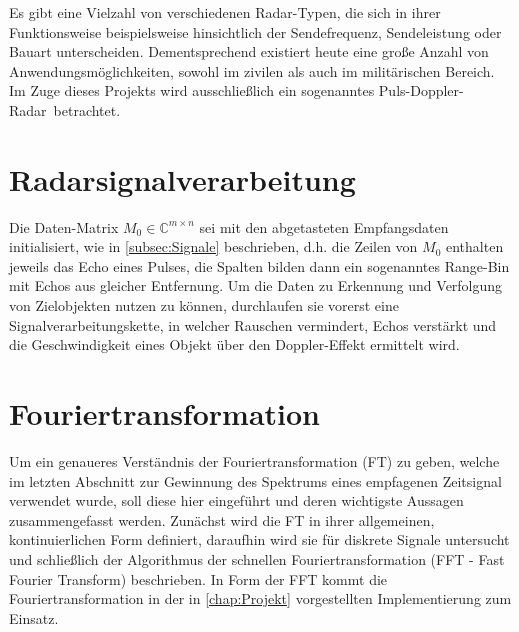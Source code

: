 \documentclass[a4paper,12pt,oneside,german,toc=bibliography]{scrbook}
\theoremstyle{definition}
\theoremstyle{plain}
\numberwithin{equation}{section}
\newcommand{\C}{\mathds{C}}
\begin{document}
Es gibt eine Vielzahl von verschiedenen Radar-Typen, die sich in ihrer Funktionsweise beispielsweise hinsichtlich der Sendefrequenz, Sendeleistung  oder Bauart unterscheiden. Dementsprechend existiert heute eine große Anzahl von Anwendungsmöglichkeiten, sowohl im zivilen als auch im militärischen Bereich. Im Zuge dieses Projekts wird ausschließlich ein sogenanntes \glqq Puls-Doppler-Radar\grqq ~betrachtet. 









\section{Radarsignalverarbeitung}
Die Daten-Matrix $M_0 \in \C^{m \times n}$ sei mit den abgetasteten Empfangsdaten initialisiert, wie in \cref{subsec:Signale} beschrieben, d.h. die Zeilen von $M_0$ enthalten jeweils das Echo eines Pulses, die Spalten bilden dann ein sogenanntes Range-Bin mit Echos aus gleicher Entfernung. Um die Daten zu Erkennung und Verfolgung von Zielobjekten nutzen zu können, durchlaufen sie vorerst eine Signalverarbeitungskette, in welcher Rauschen vermindert, Echos verstärkt und die Geschwindigkeit eines Objekt über den Doppler-Effekt ermittelt wird.







\section{Fouriertransformation}
\label{sec:FT}
Um ein genaueres Verständnis der Fouriertransformation (FT) zu geben, welche im letzten Abschnitt zur Gewinnung des Spektrums eines empfagenen Zeitsignal verwendet wurde, soll diese hier eingeführt und deren wichtigste Aussagen zusammengefasst werden. Zunächst wird die FT in ihrer allgemeinen, kontinuierlichen Form definiert, daraufhin wird sie für diskrete Signale untersucht und schließlich der Algorithmus der schnellen Fouriertransformation (FFT - Fast Fourier Transform) beschrieben. In Form der FFT kommt die Fouriertransformation in der in \cref{chap:Projekt} vorgestellten Implementierung zum Einsatz.
\end{document}
